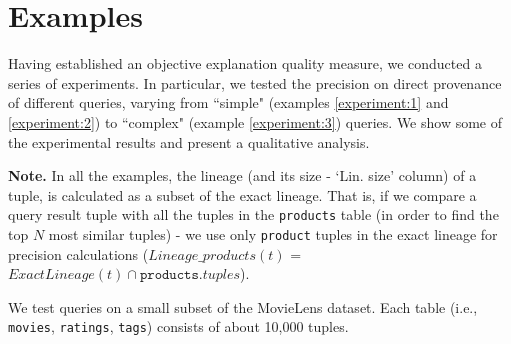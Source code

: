 \section{Examples}

Having established an objective explanation quality measure, we conducted a series of experiments. In particular, we tested the precision on direct provenance of different queries, varying from ``simple" (examples \ref{experiment:1} and \ref{experiment:2}) to ``complex" (example \ref{experiment:3}) queries. We show some of the experimental results and present a qualitative analysis.
\par\textbf{Note.} In all the examples, the lineage (and its size - `Lin. size' column) of a tuple, is calculated as a subset of the exact lineage. That is, if we compare a query result tuple with all the tuples in the \texttt{products} table (in order to find the top $N$ most similar tuples) - we use only \texttt{product} tuples in the exact lineage for precision calculations ($Lineage\_products(t)$ = $ExactLineage(t) \cap \texttt{products}.tuples$).


\begin{runexample}
We test queries on a small subset of the MovieLens dataset. Each table (i.e., \texttt{movies}, \texttt{ratings}, \texttt{tags}) consists of about 10,000 tuples.
\end{runexample}


